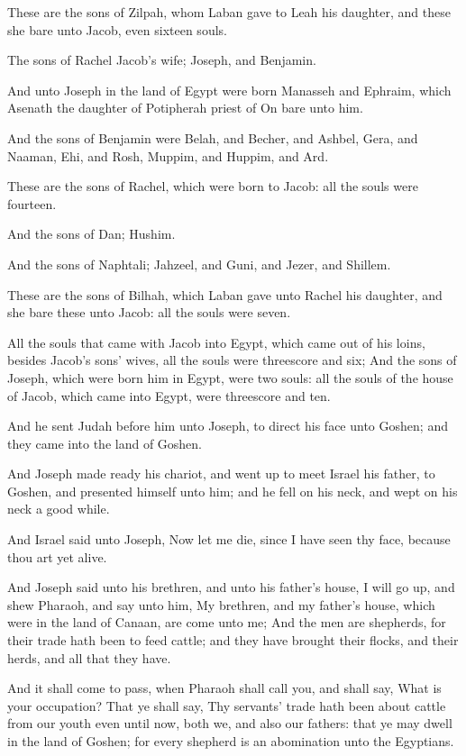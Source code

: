 \Verse These are the sons of Zilpah, whom Laban gave to Leah his daughter, and these she bare unto Jacob, even sixteen souls.

\Verse The sons of Rachel Jacob's wife; Joseph, and Benjamin.

\Verse And unto Joseph in the land of Egypt were born Manasseh and Ephraim, which Asenath the daughter of Potipherah priest of On bare unto him.

\Verse And the sons of Benjamin were Belah, and Becher, and Ashbel, Gera, and Naaman, Ehi, and Rosh, Muppim, and Huppim, and Ard.

\Verse These are the sons of Rachel, which were born to Jacob: all the souls were fourteen.

\Verse And the sons of Dan; Hushim.

\Verse And the sons of Naphtali; Jahzeel, and Guni, and Jezer, and Shillem.

\Verse These are the sons of Bilhah, which Laban gave unto Rachel his daughter, and she bare these unto Jacob: all the souls were seven.

\Verse All the souls that came with Jacob into Egypt, which came out of his loins, besides Jacob's sons' wives, all the souls were threescore and six; \Verse And the sons of Joseph, which were born him in Egypt, were two souls: all the souls of the house of Jacob, which came into Egypt, were threescore and ten.

\Verse And he sent Judah before him unto Joseph, to direct his face unto Goshen; and they came into the land of Goshen.

\Verse And Joseph made ready his chariot, and went up to meet Israel his father, to Goshen, and presented himself unto him; and he fell on his neck, and wept on his neck a good while.

\Verse And Israel said unto Joseph, Now let me die, since I have seen thy face, because thou art yet alive.

\Verse And Joseph said unto his brethren, and unto his father's house, I will go up, and shew Pharaoh, and say unto him, My brethren, and my father's house, which were in the land of Canaan, are come unto me; \Verse And the men are shepherds, for their trade hath been to feed cattle; and they have brought their flocks, and their herds, and all that they have.

\Verse And it shall come to pass, when Pharaoh shall call you, and shall say, What is your occupation?  \Verse That ye shall say, Thy servants' trade hath been about cattle from our youth even until now, both we, and also our fathers: that ye may dwell in the land of Goshen; for every shepherd is an abomination unto the Egyptians.

